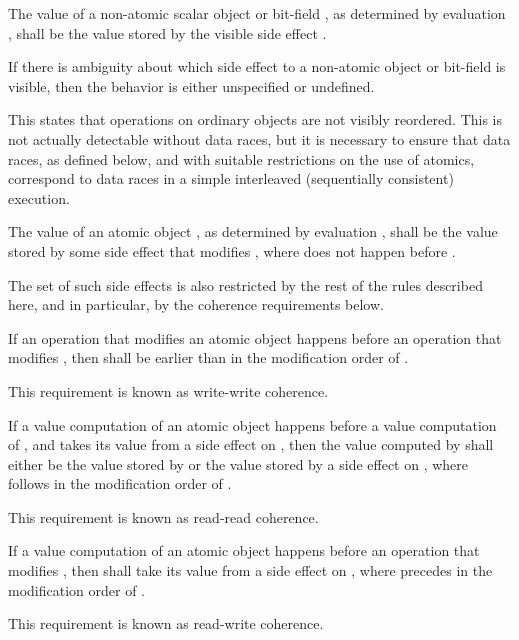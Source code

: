 The value of a non-atomic scalar object or bit-field , as determined by
evaluation , shall be the value stored by the
%
visible side effect
. \begin{note} If there is ambiguity about which side effect to a
non-atomic object or bit-field is visible, then the behavior is either
unspecified or undefined. \end{note} \begin{note} This states that operations on
ordinary objects are not visibly reordered. This is not actually detectable
without data races, but it is necessary to ensure that data races, as defined
below, and with suitable restrictions on the use of atomics, correspond to data
races in a simple interleaved (sequentially consistent) execution. \end{note}

\pnum
The value of an
atomic object , as determined by evaluation , shall be the value
stored by some
side effect  that modifies , where  does not happen
before .
\begin{note}
The set of such side effects is also restricted by the rest of the rules
described here, and in particular, by the coherence requirements below.
\end{note}

\pnum
If an operation  that modifies an atomic object  happens before
an operation  that modifies , then  shall be earlier
than  in the modification order of . \begin{note} This requirement
is known as write-write coherence. \end{note}

\pnum
If a
%
value computation  of an atomic object  happens before a
value computation  of , and  takes its value from a side
effect  on , then the value computed by  shall either be
the value stored by  or the value stored by a
%
side effect  on
, where  follows  in the modification order of .
\begin{note} This requirement is known as read-read coherence. \end{note}

\pnum
If a
%
value computation  of an atomic object  happens before an
operation  that modifies , then  shall take its value from a side
effect  on , where  precedes  in the
modification order of . \begin{note} This requirement is known as
read-write coherence. \end{note}

